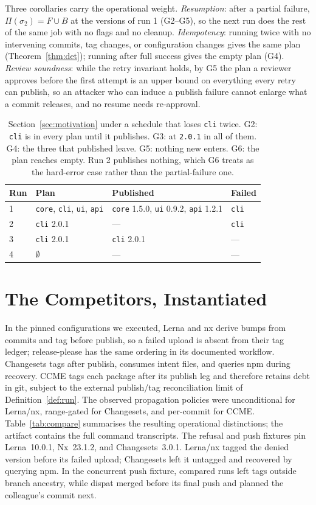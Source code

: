 \documentclass[sigconf,nonacm]{acmart}
\newcommand{\code}[1]{\texttt{#1}}
\newcommand{\G}[1]{G#1}
\begin{document}
Three corollaries carry the operational weight. \emph{Resumption}: after
a partial failure, $\Pi(\sigma_2) = F \cup B$ at the versions of run 1
(\G{2}--\G{5}), so the next run does the rest of the same job with no
flags and no cleanup. \emph{Idempotency}: running twice with no intervening
commits, tag changes, or configuration changes gives the same plan
(Theorem~\ref{thm:det});
running after full success gives the empty plan (\G{4}).
\emph{Review soundness}: while the retry invariant holds, by \G{5} the plan a reviewer approves before
the first attempt is an upper bound on everything every retry can
publish, so an attacker who can induce a publish failure cannot enlarge
what a commit releases, and no resume needs re-approval.

\begin{table}[t]
\caption{Section~\ref{sec:motivation} under a schedule that loses
\code{cli} twice. \G{2}: \code{cli} is in every plan until it
publishes. \G{3}: at \code{2.0.1} in all of them. \G{4}: the three that
published leave. \G{5}: nothing new enters. \G{6}: the plan reaches
empty. Run 2 publishes nothing, which \G{6} treats as the hard-error
case rather than the partial-failure one.}
\label{tab:runs}
\small
\begin{tabular}{@{}llll@{}}
\toprule
Run & Plan & Published & Failed \\
\midrule
1 & \code{core}, \code{cli}, \code{ui}, \code{api}
  & \code{core} 1.5.0, \code{ui} 0.9.2, \code{api} 1.2.1 & \code{cli} \\
2 & \code{cli} 2.0.1 & --- & \code{cli} \\
3 & \code{cli} 2.0.1 & \code{cli} 2.0.1 & --- \\
4 & $\emptyset$ & --- & --- \\
\bottomrule
\end{tabular}
\end{table}

\section{The Competitors, Instantiated}
\label{sec:compare}

In the pinned configurations we executed, Lerna and nx derive bumps from
commits and tag before publish, so a failed upload is absent from their tag
ledger; release-please has the same ordering in its documented workflow.
Changesets tags after publish, consumes intent files, and queries npm during
recovery.
CCME tags each package after its publish leg and therefore retains debt in git,
subject to the external publish/tag reconciliation limit of
Definition~\ref{def:run}. The observed propagation policies were unconditional
for Lerna/nx, range-gated for Changesets, and per-commit for CCME.
Table~\ref{tab:compare}
summarises the resulting operational distinctions; the artifact contains the
full command transcripts.
The refusal and push fixtures pin Lerna~10.0.1, Nx~23.1.2, and
Changesets~3.0.1. Lerna/nx tagged the denied version before its failed upload;
Changesets left it untagged and recovered by querying npm. In the concurrent
push fixture, compared runs left tags outside branch ancestry, while dispat
merged before its final push and planned the colleague's commit next.
\end{document}
